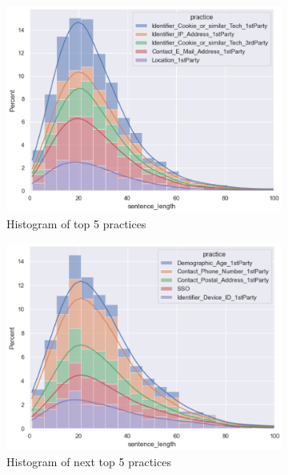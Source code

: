 \begin{figure}[!ht]
	\begin{subfigure}[t]{.5\linewidth}
	  \centering
	  \includegraphics[width=1\linewidth]{figures/hist_eda.png}
	  \caption{Histogram of top 5 practices}
	  \label{fig:hist}
	\end{subfigure}
	\hfill
	\begin{subfigure}[t]{.5\linewidth}
		\centering
		\includegraphics[width=1\linewidth]{figures/hist_eda_2.png}
		\caption{Histogram of next top 5 practices}
		\label{fig:hist_2}
	\end{subfigure}
	\medskip
	\begin{subfigure}[b]{1\linewidth}
	  \centering

\end{subfigure}
\end{figure}
